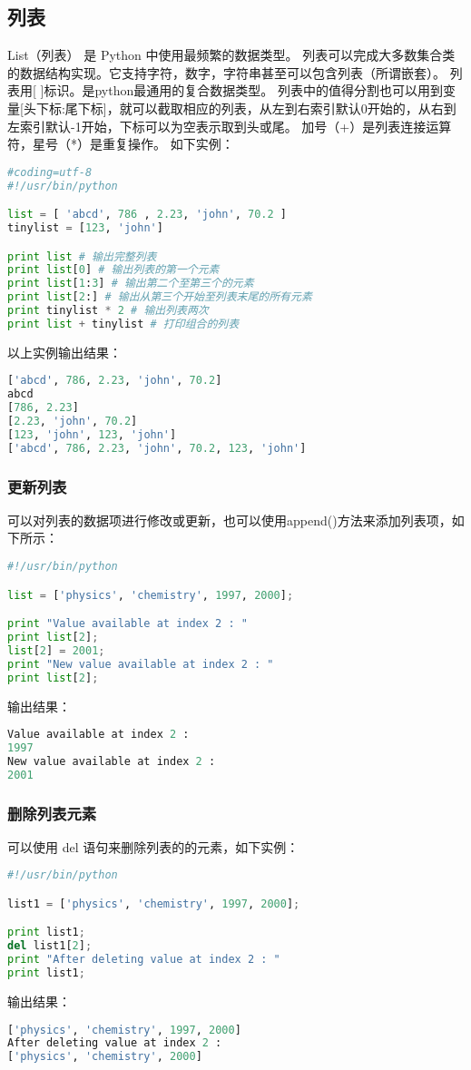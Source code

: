 \subsection{列表}
List（列表） 是 Python 中使用最频繁的数据类型。
列表可以完成大多数集合类的数据结构实现。它支持字符，数字，字符串甚至可以包含列表（所谓嵌套）。
列表用[ ]标识。是python最通用的复合数据类型。
列表中的值得分割也可以用到变量[头下标:尾下标]，就可以截取相应的列表，从左到右索引默认0开始的，从右到左索引默认-1开始，下标可以为空表示取到头或尾。
加号（+）是列表连接运算符，星号（*）是重复操作。
如下实例：
\begin{lstlisting}[language=Python]
#coding=utf-8
#!/usr/bin/python

list = [ 'abcd', 786 , 2.23, 'john', 70.2 ]
tinylist = [123, 'john']

print list # 输出完整列表
print list[0] # 输出列表的第一个元素
print list[1:3] # 输出第二个至第三个的元素 
print list[2:] # 输出从第三个开始至列表末尾的所有元素
print tinylist * 2 # 输出列表两次
print list + tinylist # 打印组合的列表
\end{lstlisting}
以上实例输出结果：
\begin{lstlisting}[language=Python]
['abcd', 786, 2.23, 'john', 70.2]
abcd
[786, 2.23]
[2.23, 'john', 70.2]
[123, 'john', 123, 'john']
['abcd', 786, 2.23, 'john', 70.2, 123, 'john']
\end{lstlisting}


\subsubsection{更新列表}
可以对列表的数据项进行修改或更新，也可以使用append()方法来添加列表项，如下所示：
\begin{lstlisting}[language=Python]
#!/usr/bin/python

list = ['physics', 'chemistry', 1997, 2000];

print "Value available at index 2 : "
print list[2];
list[2] = 2001;
print "New value available at index 2 : "
print list[2];
\end{lstlisting}
输出结果：
\begin{lstlisting}[language=Python]
Value available at index 2 :
1997
New value available at index 2 :
2001
\end{lstlisting}


\subsubsection{删除列表元素}
可以使用 del 语句来删除列表的的元素，如下实例：
\begin{lstlisting}[language=Python]
#!/usr/bin/python

list1 = ['physics', 'chemistry', 1997, 2000];

print list1;
del list1[2];
print "After deleting value at index 2 : "
print list1;
\end{lstlisting}
输出结果：
\begin{lstlisting}[language=Python]
['physics', 'chemistry', 1997, 2000]
After deleting value at index 2 :
['physics', 'chemistry', 2000]
\end{lstlisting}


